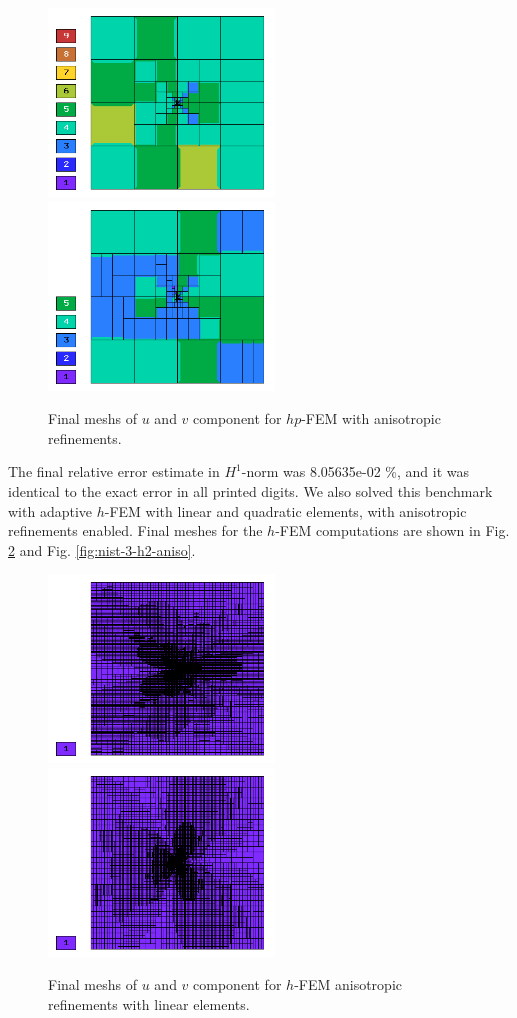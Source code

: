 \begin{figure}[!ht]
\centering
\includegraphics[height=5cm]{nist/nist-3/mesh_u_hp_anisoh.png}\ \
\includegraphics[height=5cm]{nist/nist-3/mesh_v_hp_anisoh.png}
\vspace{-2mm}
\caption{Final meshs of $u$ and $v$ component for $hp$-FEM with anisotropic refinements.}
\label{fig:nist-3-hp-aniso}
\end{figure}

The final relative error estimate in $H^1$-norm was 8.05635e-02 \%,
and it was identical to the exact error in all printed digits.
We also solved this benchmark with adaptive $h$-FEM
with linear and quadratic elements, with anisotropic refinements enabled.
Final meshes for the $h$-FEM computations are shown
in Fig. \ref{fig:nist-3-h1-aniso} and Fig. \ref{fig:nist-3-h2-aniso}.

\begin{figure}[!ht]
\centering
\includegraphics[height=5cm]{nist/nist-3/mesh_u_h1_aniso.png}\ \
\includegraphics[height=5cm]{nist/nist-3/mesh_v_h1_aniso.png}
\caption{Final meshs of $u$ and $v$ component for $h$-FEM anisotropic refinements with linear elements.}
\label{fig:nist-3-h1-aniso}
\end{figure}

